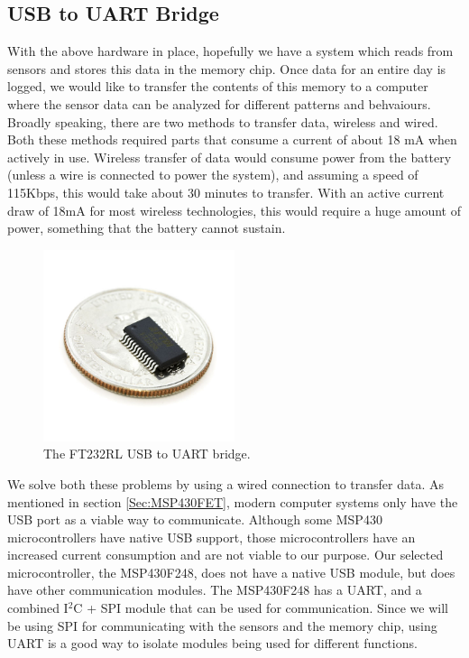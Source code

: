 \subsection{USB to UART Bridge}
\label{Sec:FT232}
With the above hardware in place, hopefully we have a system which reads from sensors and stores this data in the memory chip. Once data for an entire day is logged, we would like to transfer the contents of this memory to a computer where the sensor data can be analyzed for different patterns and behvaiours. Broadly speaking, there are two methods to transfer data, wireless and wired. Both these methods required parts that consume a current of about 18 mA when actively in use. Wireless transfer of data would consume power from the battery (unless a wire is connected to power the system), and assuming a speed of 115Kbps, this would take about 30 minutes to transfer. With an active current draw of 18mA for most wireless technologies, this would require a huge amount of power, something that the battery cannot sustain.
\begin{figure}
\begin{center}
\includegraphics[width=0.5\textwidth]{images/FT232coin.jpg}
\caption{The FT232RL USB to UART bridge.}
\label{Fig:FT232}
\end{center}
\end{figure}

We solve both these problems by using a wired connection to transfer data. As mentioned in section \ref{Sec:MSP430FET}, modern computer systems only have the USB port as a viable way to communicate. Although some MSP430 microcontrollers have native USB support, those microcontrollers have an increased current consumption and are not viable to our purpose. Our selected microcontroller, the MSP430F248, does not have a native USB module, but does have other communication modules. The MSP430F248 has a UART, and a combined I$^2$C + SPI module that can be used for communication. Since we will be using SPI for communicating with the sensors and the memory chip, using UART is a good way to isolate modules being used for different functions.

